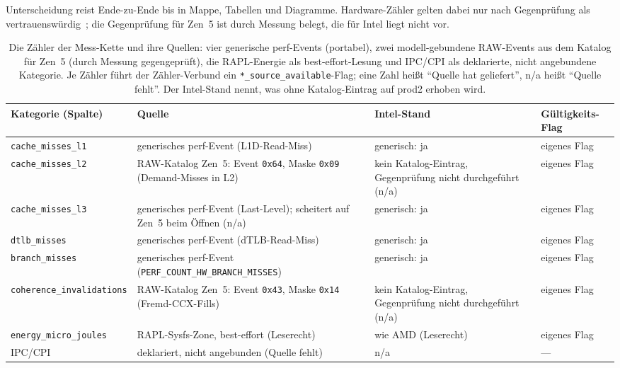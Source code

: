 \begin{nurlang}
Unterscheidung reist Ende-zu-Ende bis in Mappe, Tabellen und Diagramme. Hardware-Zähler gelten dabei
nur nach Gegenprüfung als vertrauenswürdig~\cite{weaver2008counters}; die Gegenprüfung für Zen~5 ist durch
Messung belegt, die für Intel liegt nicht vor.
\begin{table}[htbp]\centering\footnotesize
\begin{tabular}{@{}l>{\raggedright\arraybackslash}p{4.6cm}>{\raggedright\arraybackslash}p{3.2cm}>{\raggedright\arraybackslash}p{2.3cm}@{}}
\toprule
Kategorie (Spalte) & Quelle & Intel-Stand & Gültigkeits-Flag \\
\midrule
\texttt{cache\_misses\_l1} & generisches perf-Event (L1D-Read-Miss) & generisch: ja & eigenes Flag \\
\texttt{cache\_misses\_l2} & RAW-Katalog Zen~5: Event \texttt{0x64}, Maske \texttt{0x09} (Demand-Misses in L2) & kein Katalog-Eintrag, Gegenprüfung nicht durchgeführt (n/a) & eigenes Flag \\ %
\texttt{cache\_misses\_l3} & generisches perf-Event (Last-Level); scheitert auf Zen~5 beim Öffnen (n/a) & generisch: ja & eigenes Flag \\
\texttt{dtlb\_misses} & generisches perf-Event (dTLB-Read-Miss) & generisch: ja & eigenes Flag \\
\texttt{branch\_misses} & generisches perf-Event (\texttt{PERF\_COUNT\_\allowbreak{}HW\_\allowbreak{}BRANCH\_\allowbreak{}MISSES}) & generisch: ja & eigenes Flag \\
\texttt{coherence\_invalidations} & RAW-Katalog Zen~5: Event \texttt{0x43}, Maske \texttt{0x14} (Fremd-CCX-Fills) & kein Katalog-Eintrag, Gegenprüfung nicht durchgeführt (n/a) & eigenes Flag \\ %
\texttt{energy\_micro\_joules} & RAPL-Sysfs-Zone, best-effort (Leserecht) & wie AMD (Leserecht) & eigenes Flag \\
IPC/CPI & deklariert, nicht angebunden (Quelle fehlt) & n/a & --- \\
\bottomrule
\end{tabular}
\caption{Die Zähler der Mess-Kette und ihre Quellen: vier generische perf-Events (portabel), zwei
modell-gebundene RAW-Events aus dem Katalog für Zen~5 (durch Messung gegengeprüft), die RAPL-Energie als
best-effort-Lesung und IPC/CPI als deklarierte, nicht angebundene Kategorie. Je Zähler führt der
Zähler-Verbund ein \texttt{*\_source\_available}-Flag; eine Zahl heißt \enquote{Quelle hat geliefert},
n/a heißt \enquote{Quelle fehlt}. Der Intel-Stand nennt, was ohne Katalog-Eintrag auf prod2
erhoben wird.}\label{tab:eval-pmc-zaehler}
\end{table}
\end{nurlang}
